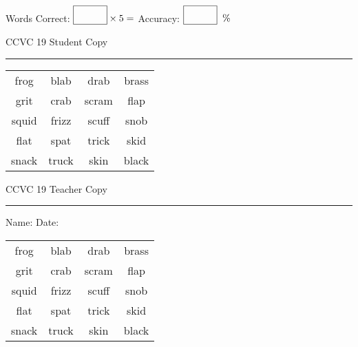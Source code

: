 \documentclass{memoir}
\begin{document}
\small

Words Correct: $\fbox{\phantom{\huge 100}} \times 5 = $ Accuracy: $\fbox{\phantom{\huge 100}}\;\; \%$ 

\vfill

\newpage


\footnotesize \noindent
CCVC 19 \hfill Student Copy
\smallskip
\hrule

\Large

\setlength{\tabcolsep}{14pt}
\def\arraystretch{3}

{\selectfont


\begin{vplace}[0.5]
\begin{center}
\begin{tabular}{cccc}
frog & blab             & drab             & brass       \\
grit      & crab        & scram & flap            \\
squid & frizz & scuff & snob \\
flat             & spat            & trick & skid \\
snack & truck & skin & black            \\
\end{tabular}
\end{center}
\end{vplace}

}

\newpage

\footnotesize \noindent
CCVC 19 \hfill Teacher Copy
\smallskip
\hrule

\small

\vfill

\noindent
Name: \underline{\hspace{1.75in}} \hfill Date: \underline{\hspace{1in}}

\Large

{\selectfont


\begin{vplace}[0.5]
\begin{center}
\begin{tabular}{cccc}
frog & blab             & drab             & brass       \\
grit      & crab        & scram & flap            \\
squid & frizz & scuff & snob \\
flat             & spat            & trick & skid \\
snack & truck & skin & black            \\
\end{tabular}
\end{center}
\end{vplace}



}
\end{document}

